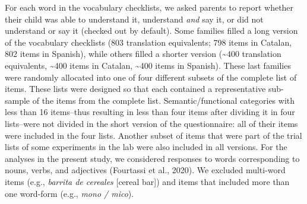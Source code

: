 \documentclass[
  letterpaper,
  DIV=11,
  numbers=noendperiod]{scrartcl}
\begin{document}
For each word in the vocabulary checklists, we asked parents to report
whether their child was able to understand it, understand \emph{and} say
it, or did not understand or say it (checked out by default). Some
families filled a long version of the vocabulary checklists (803
translation equivalents; 798 items in Catalan, 802 items in Spanish),
while others filled a shorter version (\textasciitilde400 translation
equivalents, \textasciitilde400 items in Catalan, \textasciitilde400
items in Spanish). These last families were randomly allocated into one
of four different subsets of the complete list of items. These lists
were designed so that each contained a representative sub-sample of the
items from the complete list. Semantic/functional categories with less
than 16 items--thus resulting in less than four items after dividing it
in four lists--were not divided in the short version of the
questionnaire: all of their items were included in the four lists.
Another subset of items that were part of the trial lists of some
experiments in the lab were also included in all versions. For the
analyses in the present study, we considered responses to words
corresponding to nouns, verbs, and adjectives (Fourtassi et al., 2020).
We excluded multi-word items (e.g., \emph{barrita de cereales} {[}cereal
bar{]}) and items that included more than one word-form (e.g.,
\emph{mono / mico}).
\end{document}
